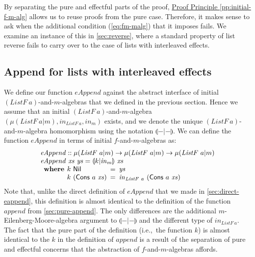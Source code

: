 \documentclass{jfp1}
\newcommand{\eFold}[2]{\llparenthesis #1|#2 \rrparenthesis}
\newcommand{\proofprinref}[1]{\hyperref[#1]{Proof Principle \ref*{#1}}}
\begin{document}
By separating the pure and effectful parts of the proof,
\proofprinref{pp:initial-f-m-alg} allows us to reuse proofs from the
pure case. Therefore, it makes sense to ask when the additional
condition (\autoref{eq:fm-malg}) that it imposes fails. We examine an
instance of this in \autoref{sec:reverse}, where a standard property
of list reverse fails to carry over to the case of lists with
interleaved effects.

\subsection{Append for lists with interleaved effects}

We define our function $\mathit{eAppend}$ against the abstract
interface of initial $(\mathit{ListF}~a)$-and-$m$-algebras that we
defined in the previous section. Hence we assume that an initial
$(\mathit{ListF}~a)$-and-$m$-algebra $(\mu(\mathit{ListF}~a|m),
\mathit{in}_{\mathit{ListF}~a}, \mathit{in}_m)$ exists, and we denote
the unique $(\mathit{ListF}~a)$-and-$m$-algebra homomorphism using the
notation $\eFold{-}{-}$. We can define the function $\mathit{eAppend}$
in terms of initial $f$-and-$m$-algebras as:
\begin{displaymath}
  \begin{array}{l}
    \mathit{eAppend} :: \mu(\mathit{ListF}~a|m) \to \mu(\mathit{ListF}~a|m) \to \mu(\mathit{ListF}~a|m) \\
    \mathit{eAppend}~\mathit{xs}~\mathit{ys} = \eFold{k}{\mathit{in}_m}~\mathit{xs} \\
    \begin{array}{r@{\hspace{0.4em}}l@{\hspace{0.5em}}c@{\hspace{0.5em}}l}
      \textbf{where} & k~\mathsf{Nil} &=& \mathit{ys} \\ &
      k~(\mathsf{Cons}~a~\mathit{xs}) &=&
      \mathit{in}_{\mathit{ListF}~a}~(\mathsf{Cons}~a~\mathit{xs})
    \end{array}
  \end{array}
\end{displaymath}
Note that, unlike the direct definition of $\mathit{eAppend}$ that we
made in \autoref{sec:direct-eappend}, this definition is almost
identical to the definition of the function $\mathit{append}$ from
\autoref{sec:pure-append}. The only differences are the additional
$m$-Eilenberg-Moore-algebra argument to $\eFold{-}{-}$ and the
different type of $\mathit{in}_{\mathit{ListF}~a}$. The fact that the
pure part of the definition (i.e.,~the function $k$) is almost
identical to the $k$ in the definition of $\mathit{append}$ is a
result of the separation of pure and effectful concerns that the
abstraction of $f$-and-$m$-algebras affords.
\end{document}
